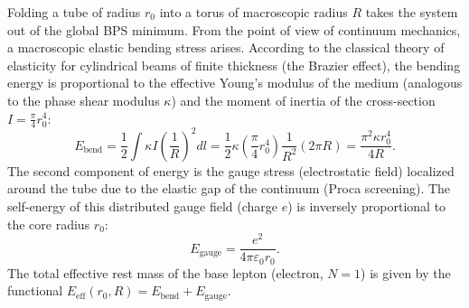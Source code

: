 \documentclass[11pt,a4paper]{article}
\begin{document}
Folding a tube of radius $r_0$ into a torus of macroscopic radius $R$ takes the system out of the global BPS minimum. From the point of view of continuum mechanics, a macroscopic elastic bending stress arises. According to the classical theory of elasticity for cylindrical beams of finite thickness (the Brazier effect), the bending energy is proportional to the effective Young's modulus of the medium (analogous to the phase shear modulus $\kappa$) and the moment of inertia of the cross-section $I = \frac{\pi}{4} r_0^4$:
\begin{equation}
E_{\text{bend}} = \frac{1}{2} \int \kappa I \left( \frac{1}{R} \right)^2 dl = \frac{1}{2} \kappa \left( \frac{\pi}{4} r_0^4 \right) \frac{1}{R^2} (2\pi R) = \frac{\pi^2 \kappa r_0^4}{4R}.
\label{eq:ebend}
\end{equation}
The second component of energy is the gauge stress (electrostatic field) localized around the tube due to the elastic gap of the continuum (Proca screening). The self-energy of this distributed gauge field (charge $e$) is inversely proportional to the core radius $r_0$:
\begin{equation}
E_{\text{gauge}} = \frac{e^2}{4\pi\varepsilon_0 r_0}.
\label{eq:egauge}
\end{equation}
The total effective rest mass of the base lepton (electron, $N=1$) is given by the functional $E_{\text{eff}}(r_0, R) = E_{\text{bend}} + E_{\text{gauge}}$.
	
\end{document}
